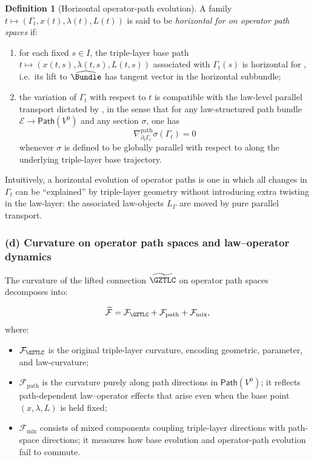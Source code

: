 \documentclass[11pt]{book}
\theoremstyle{plain}
\theoremstyle{definition}
\newtheorem{definition}[theorem]{Definition} \theoremstyle{remark}
\begin{document}
\begin{definition}[Horizontal operator-path evolution]
A family $t\mapsto(\Gamma_t,x(t),\lambda(t),L(t))$ is said to be
  \emph{horizontal for \GZTLC on operator path spaces} if:
  \begin{enumerate}[label=\roman*)]
    \item for each fixed $s\in I$, the triple-layer base path
          $t\mapsto(x(t,s),\lambda(t,s),L(t,s))$ associated with
          $\Gamma_t(s)$ is horizontal for \GZTLC, i.e.\ its lift to
          $\widehat{\Bundle}$ has tangent vector in the horizontal
          subbundle;
    \item the variation of $\Gamma_t$ with respect to $t$ is compatible
          with the law-level parallel transport dictated by \GZTLC,
          in the sense that for any law-structured path bundle
          $\mathcal{E}\to\mathsf{Path}(V^0)$ and any section
          $\sigma$, one has
          \[
             \nabla^{\mathrm{path}}_{\partial_t\Gamma_t}
               \sigma(\Gamma_t)
             = 0
          \]
          whenever $\sigma$ is defined to be globally parallel with
          respect to \GZTLC along the underlying triple-layer base
          trajectory.
  \end{enumerate}
\end{definition}

Intuitively, a horizontal evolution of operator paths is one in which
all changes in $\Gamma_t$ can be “explained” by triple-layer geometry
without introducing extra twisting in the law-layer: the associated
law-objects $L_\Gamma$ are moved by pure parallel transport.



\subsubsection*{(d) Curvature on operator path spaces and law–operator dynamics}

The curvature of the lifted connection $\widetilde{\GZTLC}$ on
operator path spaces decomposes into:

\[
   \widetilde{\mathcal{F}}
   =
   \mathcal{F}_{\GZTLC}
   + \mathcal{F}_{\mathrm{path}}
   + \mathcal{F}_{\mathrm{mix}},
\]
where:

\begin{itemize}
  \item $\mathcal{F}_{\GZTLC}$ is the original triple-layer curvature, 
        encoding geometric, parameter, \\ and law-curvature;
  \item $\mathcal{F}_{\mathrm{path}}$ is the curvature purely along
        path directions in $\mathsf{Path}(V^0)$; it reflects
        path-dependent law–operator effects that arise even when the
        base point $(x,\lambda,L)$ is held fixed;
  \item $\mathcal{F}_{\mathrm{mix}}$ consists of mixed components
        coupling triple-layer directions with path-space directions;
        it measures how base evolution and operator-path evolution
        fail to commute.
\end{itemize}
\end{document}
